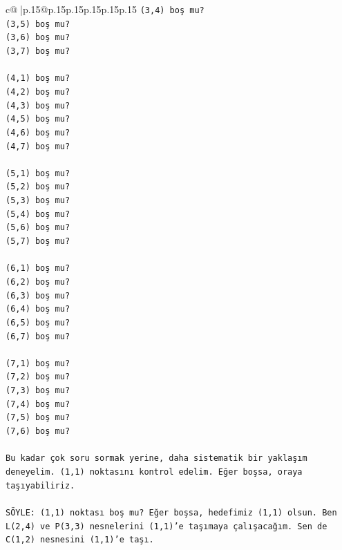 \documentclass{article}
\begin{document}
{\begin{supertabular}{c@{$\;$}|p{.15\linewidth}@{}p{.15\linewidth}p{.15\linewidth}p{.15\linewidth}p{.15\linewidth}p{.15\linewidth}}
{{{\texttt{(3,4) boş mu?} \\
\texttt{(3,5) boş mu?} \\
\texttt{(3,6) boş mu?} \\
\texttt{(3,7) boş mu?} \\
\\ 
\texttt{(4,1) boş mu?} \\
\texttt{(4,2) boş mu?} \\
\texttt{(4,3) boş mu?} \\
\texttt{(4,5) boş mu?} \\
\texttt{(4,6) boş mu?} \\
\texttt{(4,7) boş mu?} \\
\\ 
\texttt{(5,1) boş mu?} \\
\texttt{(5,2) boş mu?} \\
\texttt{(5,3) boş mu?} \\
\texttt{(5,4) boş mu?} \\
\texttt{(5,6) boş mu?} \\
\texttt{(5,7) boş mu?} \\
\\ 
\texttt{(6,1) boş mu?} \\
\texttt{(6,2) boş mu?} \\
\texttt{(6,3) boş mu?} \\
\texttt{(6,4) boş mu?} \\
\texttt{(6,5) boş mu?} \\
\texttt{(6,7) boş mu?} \\
\\ 
\texttt{(7,1) boş mu?} \\
\texttt{(7,2) boş mu?} \\
\texttt{(7,3) boş mu?} \\
\texttt{(7,4) boş mu?} \\
\texttt{(7,5) boş mu?} \\
\texttt{(7,6) boş mu?} \\
\\ 
\texttt{Bu kadar çok soru sormak yerine, daha sistematik bir yaklaşım deneyelim. (1,1) noktasını kontrol edelim. Eğer boşsa, oraya taşıyabiliriz.} \\
\\ 
\texttt{SÖYLE: (1,1) noktası boş mu? Eğer boşsa, hedefimiz (1,1) olsun. Ben L(2,4) ve P(3,3) nesnelerini (1,1)'e taşımaya çalışacağım. Sen de C(1,2) nesnesini (1,1)'e taşı.} \\
            }
        }
    }
     \\ \\


\end{supertabular}}
\end{document}
